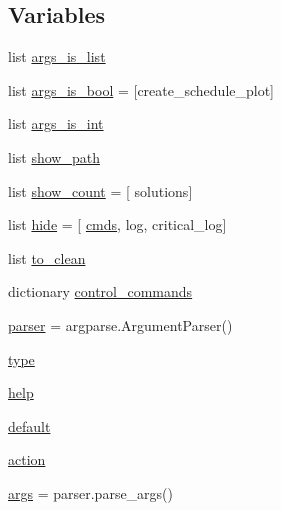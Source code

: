 \subsection*{Variables}
\begin{DoxyCompactItemize}
\item 
list \hyperlink{namespacesylva_1_1misc_1_1exec_ad4e06816081842df2a374dacb3c53b11}{args\+\_\+is\+\_\+list}
\item 
list \hyperlink{namespacesylva_1_1misc_1_1exec_afdca862c4a70bb6e0c6221bbde59c419}{args\+\_\+is\+\_\+bool} = \mbox{[}\textquotesingle{}create\+\_\+schedule\+\_\+plot\textquotesingle{}\mbox{]}
\item 
list \hyperlink{namespacesylva_1_1misc_1_1exec_ae7fc0e00f14e3c7852e0c1d1c1740cf6}{args\+\_\+is\+\_\+int}
\item 
list \hyperlink{namespacesylva_1_1misc_1_1exec_a89f5942ad18e46f54d1974b4a1d4838f}{show\+\_\+path}
\item 
list \hyperlink{namespacesylva_1_1misc_1_1exec_a2c1ed762afc31e92a91c4d0831d970b2}{show\+\_\+count} = \mbox{[} \textquotesingle{}solutions\textquotesingle{}\mbox{]}
\item 
list \hyperlink{namespacesylva_1_1misc_1_1exec_a3ea80c1ba7b91d1eee2ec5ab2e47082d}{hide} = \mbox{[} \textquotesingle{}\hyperlink{namespacesylva_1_1misc_1_1exec_a4c36666d7d4852a6684f769a8bc916f4}{cmds}\textquotesingle{}, \textquotesingle{}log\textquotesingle{}, \textquotesingle{}critical\+\_\+log\textquotesingle{}\mbox{]}
\item 
list \hyperlink{namespacesylva_1_1misc_1_1exec_ac117b58661906ce710d1cbe733234572}{to\+\_\+clean}
\item 
dictionary \hyperlink{namespacesylva_1_1misc_1_1exec_ad240a67608e9c967e361585ab8412a98}{control\+\_\+commands}
\item 
\hyperlink{namespacesylva_1_1misc_1_1exec_a36980d7eaec0bff33760c01753b501ae}{parser} = argparse.\+Argument\+Parser()
\item 
\hyperlink{namespacesylva_1_1misc_1_1exec_a55d55e6d0e68715dfbd883034bd7290c}{type}
\item 
\hyperlink{namespacesylva_1_1misc_1_1exec_aeda0fdf1916b33ff3f5731b2bd0e8d4b}{help}
\item 
\hyperlink{namespacesylva_1_1misc_1_1exec_abb9ca065b61fa23e0f7235833304ebc8}{default}
\item 
\hyperlink{namespacesylva_1_1misc_1_1exec_acefdfd260f460b44956d07b1c000f5fc}{action}
\item 
\hyperlink{namespacesylva_1_1misc_1_1exec_a4e70593929af3f6aa7fa94d0b4318766}{args} = parser.\+parse\+\_\+args()

\end{DoxyCompactItemize}
